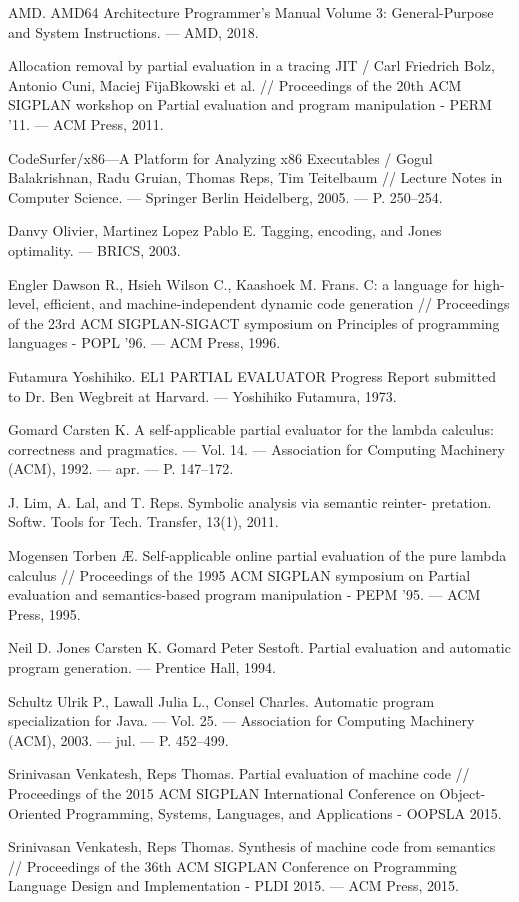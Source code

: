 \begin{thebibliography}{99}

  AMD. AMD64 Architecture Programmer’s Manual Volume 3: General-Purpose and System Instructions. –– AMD, 2018.
  
Allocation removal by partial evaluation in a tracing JIT / Carl Friedrich Bolz, Antonio Cuni, Maciej FijaBkowski et al. // Proceedings of the 20th ACM SIGPLAN workshop on Partial evaluation and program manipulation - PERM '11. –– ACM Press, 2011.

CodeSurfer/x86—A Platform for Analyzing x86 Executables / Gogul Balakrishnan, Radu Gruian, Thomas Reps, Tim Teitelbaum // Lecture Notes in Computer Science. –– Springer Berlin Heidelberg, 2005. –– P. 250–254.

Danvy Olivier, Martinez Lopez Pablo E. Tagging, encoding, and Jones optimality. –– BRICS, 2003.

Engler Dawson R., Hsieh Wilson C., Kaashoek M. Frans. C: a language for high-level, efficient, and machine-independent dynamic code generation // Proceedings of the 23rd ACM SIGPLAN-SIGACT symposium on Principles of programming languages - POPL '96. –– ACM Press, 1996.

Futamura Yoshihiko. EL1 PARTIAL EVALUATOR Progress Report submitted to Dr. Ben Wegbreit at Harvard. –– Yoshihiko Futamura, 1973.

Gomard Carsten K. A self-applicable partial evaluator for the lambda calculus: correctness and pragmatics. –– Vol. 14. –– Association for Computing Machinery (ACM), 1992. –– apr. –– P. 147–172.

J. Lim, A. Lal, and T. Reps. Symbolic analysis via semantic reinter- pretation. Softw. Tools for Tech. Transfer, 13(1), 2011.

Mogensen Torben Æ. Self-applicable online partial evaluation of the pure lambda calculus // Proceedings of the 1995 ACM SIGPLAN symposium on Partial evaluation and semantics-based program manipulation - PEPM '95. –– ACM Press, 1995.

Neil D. Jones Carsten K. Gomard Peter Sestoft. Partial evaluation and automatic program generation. –– Prentice Hall, 1994.

Schultz Ulrik P., Lawall Julia L., Consel Charles. Automatic program specialization for Java. –– Vol. 25. –– Association for Computing Machinery (ACM), 2003. –– jul. –– P. 452–499.

Srinivasan Venkatesh, Reps Thomas. Partial evaluation of machine code // Proceedings of the 2015 ACM SIGPLAN International Conference on Object-Oriented Programming, Systems, Languages, and Applications - OOPSLA 2015. 

Srinivasan Venkatesh, Reps Thomas. Synthesis of machine code from semantics // Proceedings of the 36th ACM SIGPLAN Conference on Programming Language Design and Implementation - PLDI 2015. –– ACM Press, 2015. 
  
\end{thebibliography}
  
